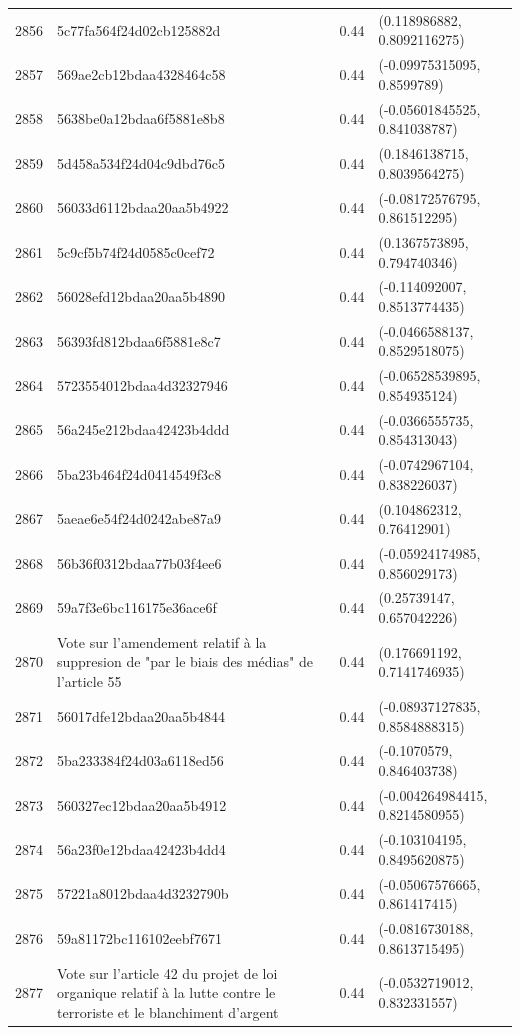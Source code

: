 \begin{table}[ht]
\begin{tabular}{rlrl}
  2856 & 5c77fa564f24d02cb125882d & 0.44 & (0.118986882, 0.8092116275) \\ 
  2857 & 569ae2cb12bdaa4328464c58 & 0.44 & (-0.09975315095, 0.8599789) \\ 
  2858 & 5638be0a12bdaa6f5881e8b8 & 0.44 & (-0.05601845525, 0.841038787) \\ 
  2859 & 5d458a534f24d04c9dbd76c5 & 0.44 & (0.1846138715, 0.8039564275) \\ 
  2860 & 56033d6112bdaa20aa5b4922 & 0.44 & (-0.08172576795, 0.861512295) \\ 
  2861 & 5c9cf5b74f24d0585c0cef72 & 0.44 & (0.1367573895, 0.794740346) \\ 
  2862 & 56028efd12bdaa20aa5b4890 & 0.44 & (-0.114092007, 0.8513774435) \\ 
  2863 & 56393fd812bdaa6f5881e8c7 & 0.44 & (-0.0466588137, 0.8529518075) \\ 
  2864 & 5723554012bdaa4d32327946 & 0.44 & (-0.06528539895, 0.854935124) \\ 
  2865 & 56a245e212bdaa42423b4ddd & 0.44 & (-0.0366555735, 0.854313043) \\ 
  2866 & 5ba23b464f24d0414549f3c8 & 0.44 & (-0.0742967104, 0.838226037) \\ 
  2867 & 5aeae6e54f24d0242abe87a9 & 0.44 & (0.104862312, 0.76412901) \\ 
  2868 & 56b36f0312bdaa77b03f4ee6 & 0.44 & (-0.05924174985, 0.856029173) \\ 
  2869 & 59a7f3e6bc116175e36ace6f & 0.44 & (0.25739147, 0.657042226) \\ 
  2870 & Vote sur l'amendement relatif à la suppresion de "par le biais des médias" de l'article 55 & 0.44 & (0.176691192, 0.7141746935) \\ 
  2871 & 56017dfe12bdaa20aa5b4844 & 0.44 & (-0.08937127835, 0.8584888315) \\ 
  2872 & 5ba233384f24d03a6118ed56 & 0.44 & (-0.1070579, 0.846403738) \\ 
  2873 & 560327ec12bdaa20aa5b4912 & 0.44 & (-0.004264984415, 0.8214580955) \\ 
  2874 & 56a23f0e12bdaa42423b4dd4 & 0.44 & (-0.103104195, 0.8495620875) \\ 
  2875 & 57221a8012bdaa4d3232790b & 0.44 & (-0.05067576665, 0.861417415) \\ 
  2876 & 59a81172bc116102eebf7671 & 0.44 & (-0.0816730188, 0.8613715495) \\ 
  2877 & Vote sur l'article 42 du projet de loi organique relatif à la lutte contre le terroriste et le blanchiment d'argent & 0.44 & (-0.0532719012, 0.832331557) \\ 

\end{tabular}
\end{table}
